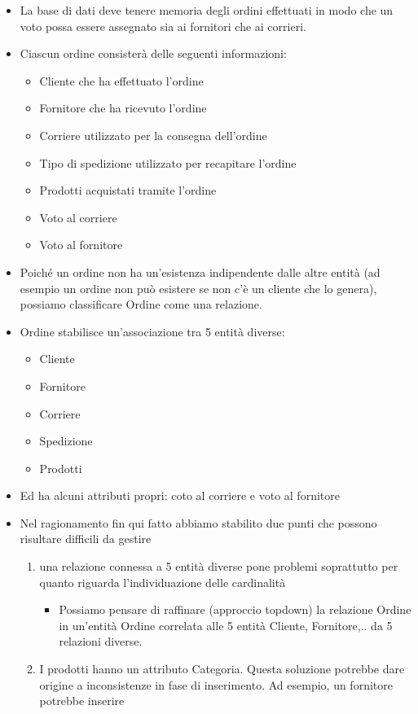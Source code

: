 \begin{itemize}
	\item La base di dati deve tenere memoria degli ordini effettuati in modo che un voto possa essere assegnato sia ai fornitori che ai corrieri.
	\item Ciascun ordine consisterà delle seguenti informazioni:
	\begin{itemize}
		\item Cliente che ha effettuato l’ordine
		\item Fornitore che ha ricevuto l’ordine
		\item Corriere utilizzato per la consegna dell’ordine
		\item Tipo di spedizione utilizzato per recapitare l’ordine
		\item Prodotti acquistati tramite l’ordine
		\item Voto al corriere
		\item Voto al fornitore
	\end{itemize}
	\item Poiché un ordine non ha un’esistenza indipendente dalle altre entità (ad esempio un ordine non può esistere se non c’è un cliente che lo genera), possiamo classificare Ordine come una relazione.
	\item Ordine stabilisce un’associazione tra 5 entità diverse:
	\begin{itemize}
		\item Cliente
		\item Fornitore
		\item Corriere
		\item Spedizione
		\item Prodotti
	\end{itemize}
	\item Ed ha alcuni attributi propri: coto al corriere e voto al fornitore
	\item Nel ragionamento fin qui fatto abbiamo stabilito due punti che possono risultare difficili da gestire
	\begin{enumerate}
		\item una relazione connessa a 5 entità diverse pone problemi soprattutto per quanto riguarda l’individuazione delle cardinalità
		\begin{itemize}
			\item Possiamo pensare di raffinare (approccio topdown) la relazione Ordine in un’entità Ordine correlata alle 5 entità Cliente, Fornitore,.. da 5 relazioni diverse.
		\end{itemize}
		\item I prodotti hanno un attributo Categoria. Questa soluzione potrebbe dare origine a inconsistenze in fase di inserimento. Ad esempio, un fornitore potrebbe inserire

\end{enumerate}
\end{itemize}
